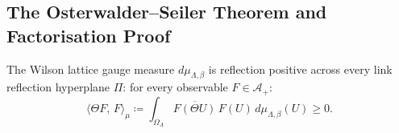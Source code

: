 \subsection{The Osterwalder--Seiler Theorem and Factorisation Proof}
\label{subsec:os_rp_proof}
\begin{theorem}
\label{thm:os_rp}
\label{thm:os_rp_main}
The Wilson lattice gauge measure $d\mu_{\Lambda, \beta}$ is reflection positive across every link reflection hyperplane $\Pi$: for every observable $F \in \mathcal{A}_+$:
\begin{equation}
\label{eq:reflection_positivity_exact}
\langle \Theta F, \, F \rangle_{\mu} \coloneqq \int_{\Omega_\Lambda} \overline{F(\Theta U)} \, F(U) \, d\mu_{\Lambda, \beta}(U) \ge 0.
\end{equation}
\end{theorem}

